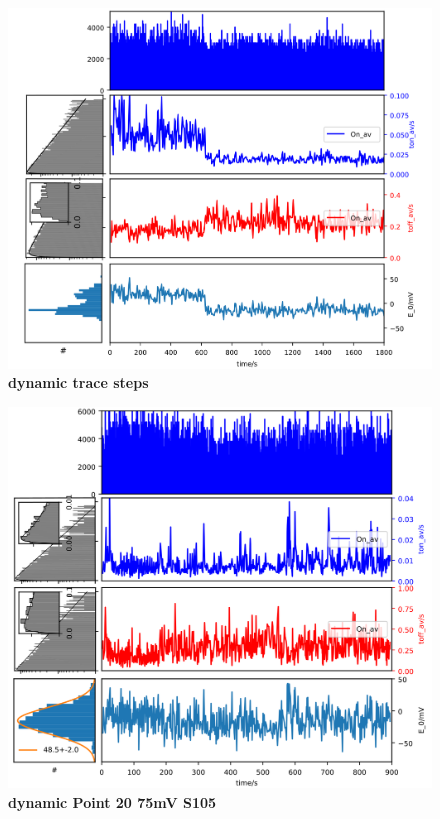 \documentclass[11pt,a4paper,onecolumn]{article}
\begin{document}
\begin{figure}
  \centering
  \includegraphics[width=\textwidth]{dynamic_trace_steps}
  \caption{\textbf{dynamic trace steps}}
  \label{fig:dynamic_trace_steps}
\end{figure}
\begin{figure}
  \centering
  \includegraphics[width=\textwidth]{dynamic_Point_20_75mV_S105}
  \caption{\textbf{dynamic Point 20 75mV S105}}
  \label{fig:dynamic_Point_20_75mV_S105}
\end{figure}
\end{document}
